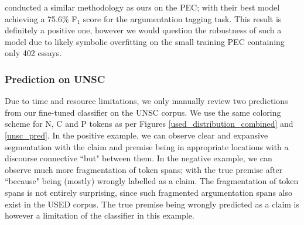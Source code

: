 \citet{eger2017neural} conducted a similar methodology as ours on the PEC; with their best model achieving a 75.6$\%$ F$_1$ score for the argumentation tagging task. This result is definitely a positive one, however we would question the robustness of such a model due to likely symbolic overfitting on the small training PEC containing only 402 essays.

\subsubsection{Prediction on UNSC}
\label{manual_semantic}

Due to time and resource limitations, we only manually review two predictions from our fine-tuned classifier on the UNSC corpus. We use the same coloring scheme for N, C and P tokens as per Figures \ref{used_distribution_combined} and \ref{unsc_pred}. In the positive example, we can observe clear and expansive segmentation with the claim and premise being in appropriate locations with a discourse connective ``but" between them. In the negative example, we can observe much more fragmentation of token spans; with the true premise after ``because" being (mostly) wrongly labelled as a claim. The fragmentation of token spans is not entirely surprising, since such fragmented argumentation spans also exist in the USED corpus. The true premise being wrongly predicted as a claim is however a limitation of the classifier in this example.

